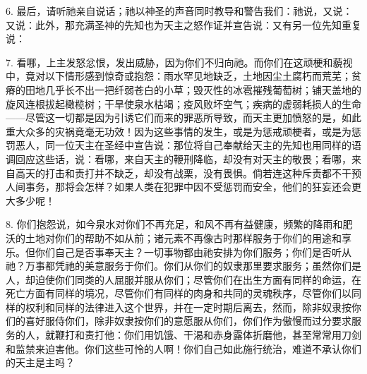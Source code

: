 6. 最后，请听祂亲自说话；祂以神圣的声音同时教导和警告我们：祂说，又说：又说：此外，那充满圣神的先知也为天主之怒作证并宣告说：又有另一位先知重复说：\par

7. 看哪，上主发怒忿恨，发出威胁，因为你们不归向祂。而你们在这顽梗和藐视中，竟对以下情形感到惊奇或抱怨：雨水罕见地缺乏，土地因尘土腐朽而荒芜；贫瘠的田地几乎长不出一把纤弱苍白的小草；毁灭性的冰雹摧残葡萄树；铺天盖地的旋风连根拔起橄榄树；干旱使泉水枯竭；疫风败坏空气；疾病的虚弱耗损人的生命——尽管这一切都是因为引诱它们而来的罪恶所导致，而天主更加愤怒的是，如此重大众多的灾祸竟毫无功效！因为这些事情的发生，或是为惩戒顽梗者，或是为惩罚恶人，同一位天主在圣经中宣告说：那位将自己奉献给天主的先知也用同样的语调回应这些话，说：看哪，来自天主的鞭刑降临，却没有对天主的敬畏；看哪，来自高天的打击和责打并不缺乏，却没有战栗，没有畏惧。倘若连这种斥责都不干预人间事务，那将会怎样？如果人类在犯罪中因不受惩罚而安全，他们的狂妄还会更大多少呢！\par

8. 你们抱怨说，如今泉水对你们不再充足，和风不再有益健康，频繁的降雨和肥沃的土地对你们的帮助不如从前；诸元素不再像古时那样服务于你们的用途和享乐。但你们自己是否事奉天主？一切事物都由祂安排为你们服务；你们是否听从祂？万事都凭祂的美意服务于你们。你们从你们的奴隶那里要求服务；虽然你们是人，却迫使你们同类的人屈服并服从你们；尽管你们在出生方面有同样的命运，在死亡方面有同样的境况，尽管你们有同样的肉身和共同的灵魂秩序，尽管你们以同样的权利和同样的法律进入这个世界，并在一定时期后离去，然而，除非奴隶按你们的喜好服侍你们，除非奴隶按你们的意愿服从你们，你们作为傲慢而过分要求服务的人，就鞭打和责打他：你们用饥饿、干渴和赤身露体折磨他，甚至常常用刀剑和监禁来迫害他。你们这些可怜的人啊！你们自己如此施行统治，难道不承认你们的天主是主吗？\par

